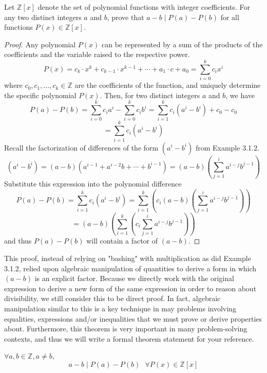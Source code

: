 \begin{example}
    Let $\mathbb{Z}[x]$ denote the set of polynomial functions with integer coefficients. For any two distinct integers $a$ and $b$, prove that $a - b  \mid P(a) - P(b)$ for all functions $P(x) \in \mathbb{Z}[x]$.
\end{example}

\begin{proof}
    Any polynomial $P(x)$ can be represented by a sum of the products of the coefficients and the variable raised to the respective power.
    \[
    P(x) = c_k \cdot x^k + c_{k-1} \cdot x^{k-1} + \cdots + a_1 \cdot c + a_0 = \sum_{i=0}^{k} c_ix^i 
    \]
    where $c_0, c_1, \ldots, c_k \in \mathbb{Z}$ are the coefficients of the function, and uniquely determine the specific polynomial $P(x)$. Then, for two distinct integers $a$ and $b$, we have 
    \[
    P(a) - P(b) = \sum_{i=0}^{k} c_ia^i -\sum_{i=0}^{k} c_ib^i  = \sum_{i=1}^{k}c_i(a^i-b^i) + c_0 - c_0
    \]
    \[
    =\sum_{i=1}^{k}c_i(a^i-b^i)
    \]
    Recall the factorization of differences of the form $(a^i -b^i)$ from Example 3.1.2.
    \[
    (a^i -b^i) = (a-b)(a^{i-1} + a^{i-2}b + \cdots + b^{i-1}) = (a-b)\left(\sum_{j=1}^{i}{a^{i-j}b^{j-1}}\right)
    \]
    Substitute this expression into the polynomial difference
    \[
    P(a) - P(b) = \sum_{i=1}^{k}c_i(a^i-b^i) = \sum_{i=1}^{k}\left(c_i(a-b)\left(\sum_{j=1}^{i}{a^{i-j}b^{j-1}}\right)\right) 
    \]
    \[
    = (a-b)\left(\sum_{i=1}^{k}\left(c_i\sum_{j=1}^{i}{a^{i-j}b^{j-1}}\right)\right)
    \]
    and thus $P(a) - P(b)$ will contain a factor of $(a-b)$. 
\end{proof}

This proof, instead of relying on "bashing" with multiplication as did Example 3.1.2, relied upon algebraic manipulation of quantities to derive a form in which $(a-b)$ is an explicit factor. Because we directly work with the original expression to derive a new form of the same expression in order to reason about divisibility, we still consider this to be direct proof. In fact, algebraic manipulation similar to this is a key technique in may problems involving equalities, expressions and/or inequalities that we must prove or derive properties about. Furthermore, this theorem is very important in many problem-solving contexts, and thus we will write a formal theorem statement for your reference. 

\begin{theorem}
     $\forall a, b \in \mathbb{Z}, a \neq b$,   \[a - b  \mid P(a) - P(b) ~~~ \forall P(x) \in \mathbb{Z}[x]\]
\end{theorem}

